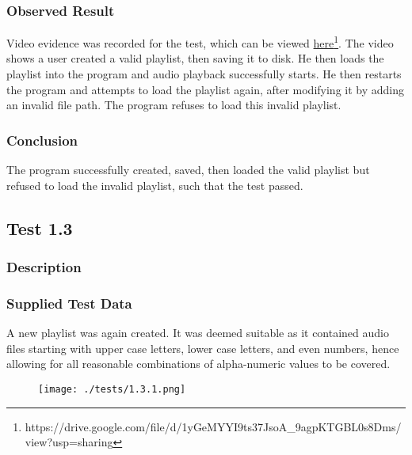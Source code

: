 \subsubsection*{Observed Result}
\label{sec:evidence1.2}
Video evidence was recorded for the test, which can be viewed \href{https://drive.google.com/file/d/1yGeMYYI9ts37JsoA_9agpKTGBL0s8Dms/view?usp=sharing}{here}\footnote{
	https://drive.google.com/file/d/1yGeMYYI9ts37JsoA\_9agpKTGBL0s8Dms/view?usp=sharing
}.  The video shows a user created a valid playlist, then saving it to disk. He then loads the playlist into the program and audio playback successfully starts. He then restarts the program and attempts to load the playlist again, after modifying it by adding an invalid file path. The program refuses to load this invalid playlist.

\subsubsection*{Conclusion}
The program successfully created, saved, then loaded the valid playlist but refused to load the invalid playlist, such that the test passed.

\pagebreak
\subsection{Test 1.3}
\subsubsection*{Description}
\paragraph{}
{
	\centering
}

\subsubsection*{Supplied Test Data}
A new playlist was again created. It was deemed suitable as it contained audio files starting with upper case letters, lower case letters, and even numbers, hence allowing for all reasonable combinations of alpha-numeric values to be covered.
\begin{figure}[H]
	\texttt{[image: ./tests/1.3.1.png]}
\end{figure}

